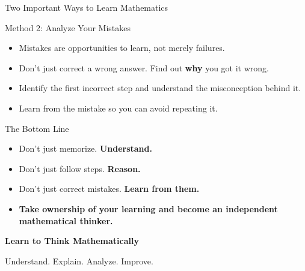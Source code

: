 \documentclass[aspectratio=169]{beamer}
\begin{document}
\begin{frame}{Two Important Ways to Learn Mathematics}

    \begin{block}{Method 2: Analyze Your Mistakes}
        \begin{itemize}
            \item Mistakes are opportunities to learn,
                  not merely failures.
            \pause

            \item Don't just correct a wrong answer.
                  Find out \textbf{why} you got it wrong.
            \pause

            \item Identify the first incorrect step and
                  understand the misconception behind it.
            \pause

            \item Learn from the mistake so you can avoid
                  repeating it.
            \pause
        \end{itemize}
    \end{block}

\end{frame}

\begin{frame}{The Bottom Line}

    \begin{itemize}
        \item Don't just memorize. \textbf{Understand.}
        \pause

        \item Don't just follow steps. \textbf{Reason.}
        \pause

        \item Don't just correct mistakes.
              \textbf{Learn from them.}
        \pause

        \item \textbf{Take ownership of your learning and
              become an independent mathematical thinker.}
        \pause
    \end{itemize}

\end{frame}

\begin{frame}[plain]
    \centering
    \vfill

    {\Huge\bfseries Learn to Think Mathematically}

    \vspace{1cm}

    {\large Understand. Explain. Analyze. Improve.}

    \vfill
\end{frame}
\end{document}
